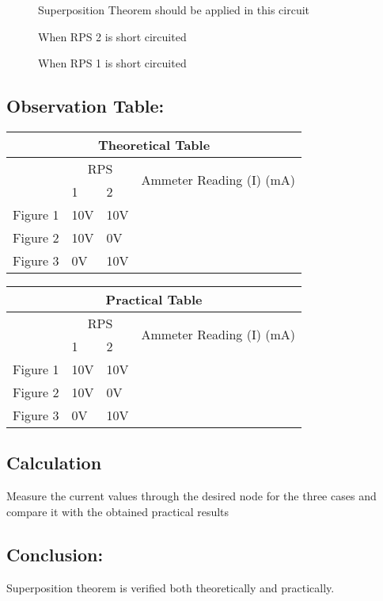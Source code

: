 \begin{figure}[H]
    \centering
    
    \caption{Superposition Theorem should be applied in this circuit}
    \label{fig:sup}
\end{figure}

\begin{figure}[H]
    \centering
    
    \caption{When RPS 2 is short circuited}
    \label{fig:rps_2}
\end{figure}

\begin{figure}[H]
    \centering
    
    \caption{When RPS 1 is short circuited}
    \label{fig:rps_1}
\end{figure}

\subsection*{Observation Table:}

\begin{table}[h]
    \centering
    \begin{tabular}{m{2cm}|m{1.5cm}|m{1.5cm}|m{5cm}}
        \multicolumn{4}{c}{\textbf{Theoretical Table}} \\
        \hline
        & \multicolumn{2}{c|}{RPS} & \multirow{2}{*}{Ammeter Reading (I) (mA)} \\
        \cline{2-3}
        & 1 & 2 & \\
        \hline
        Figure 1 & 10V & 10V & \\
        \hline
        Figure 2 & 10V & 0V & \\
        \hline
        Figure 3 & 0V & 10V & \\
        \hline
    \end{tabular}
\end{table}

\begin{table}[h]
    \centering
    \begin{tabular}{m{2cm}|m{1.5cm}|m{1.5cm}|m{5cm}}
        
        \multicolumn{4}{c}{\textbf{Practical Table}} \\
        \hline
        & \multicolumn{2}{c|}{RPS} & \multirow{2}{*}{Ammeter Reading (I) (mA)} \\
        \cline{2-3}
        & 1 & 2 & \\
        \hline
        Figure 1 & 10V & 10V & \\
        \hline
        Figure 2 & 10V & 0V & \\
        \hline
        Figure 3 & 0V & 10V & \\
        \hline
    \end{tabular}
\end{table}


\subsection*{Calculation}
Measure the current values through the desired node for the three cases and compare it with the obtained practical results

\subsection*{Conclusion:}
Superposition theorem is verified both theoretically and practically.

\newpage